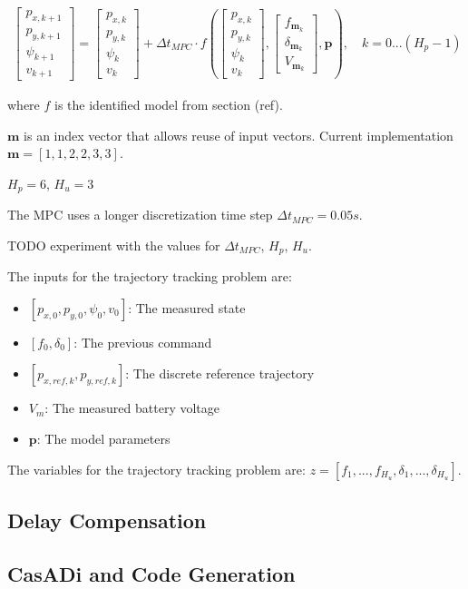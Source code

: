 \documentclass[12pt]{article}
\begin{document}
\begin{align*}
\begin{bmatrix}
p_{x,k+1}  \\
p_{y,k+1}  \\
\psi_{k+1}  \\
v_{k+1}  
\end{bmatrix}
= 
\begin{bmatrix}
p_{x,k}  \\
p_{y,k}  \\
\psi_{k}  \\
v_{k}  
\end{bmatrix}
+
\Delta t_{MPC} \cdot f\left(
\begin{bmatrix}
p_{x,k}  \\
p_{y,k}  \\
\psi_{k}  \\
v_{k}  
\end{bmatrix}
,  
\begin{bmatrix}
f_{\boldsymbol{m}_k}  \\
\delta_{\boldsymbol{m}_k}  \\
V_{\boldsymbol{m}_k} 
\end{bmatrix}
, \boldsymbol{p}\right), \quad k = 0 ... (H_p-1)
\end{align*}

where $f$ is the identified model from section (ref).

$\boldsymbol{m}$ is an index vector that allows reuse of input vectors. Current implementation $\boldsymbol{m} = [1, 1, 2, 2, 3, 3]$.

$H_p = 6$, $H_u = 3$

The MPC uses a longer discretization time step $\Delta t_{MPC} = 0.05s$. 

TODO experiment with the values for $\Delta t_{MPC}$, $H_p$, $H_u$.

The inputs for the trajectory tracking problem are:

\begin{itemize}
\item $[p_{x,0}, p_{y,0}, \psi_{0}, v_{0}]$: The measured state
\item $[f_{0}, \delta_{0}]$: The previous command
\item $[p_{x,ref,k}, p_{y,ref,k}]$: The discrete reference trajectory
\item $V_m$: The measured battery voltage
\item $\boldsymbol{p}$: The model parameters
\end{itemize}


The variables for the trajectory tracking problem are: $z = [f_1, ..., f_{H_u}, \delta_1, ..., \delta_{H_u}]$.


\subsection{Delay Compensation}


\subsection{CasADi and Code Generation}
\end{document}

